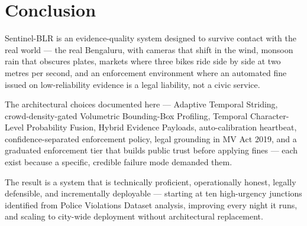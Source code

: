 \documentclass[11pt,a4paper]{article}
\begin{document}
\section{Conclusion}

Sentinel-BLR is an evidence-quality system designed to survive contact with the real world --- the real Bengaluru, with cameras that shift in the wind, monsoon rain that obscures plates, markets where three bikes ride side by side at two metres per second, and an enforcement environment where an automated fine issued on low-reliability evidence is a legal liability, not a civic service.

The architectural choices documented here --- Adaptive Temporal Striding, crowd-density-gated Volumetric Bounding-Box Profiling, Temporal Character-Level Probability Fusion, Hybrid Evidence Payloads, auto-calibration heartbeat, confidence-separated enforcement policy, legal grounding in MV Act 2019, and a graduated enforcement tier that builds public trust before applying fines --- each exist because a specific, credible failure mode demanded them.

The result is a system that is technically proficient, operationally honest, legally defensible, and incrementally deployable --- starting at ten high-urgency junctions identified from Police Violations Dataset analysis, improving every night it runs, and scaling to city-wide deployment without architectural replacement.
\end{document}
